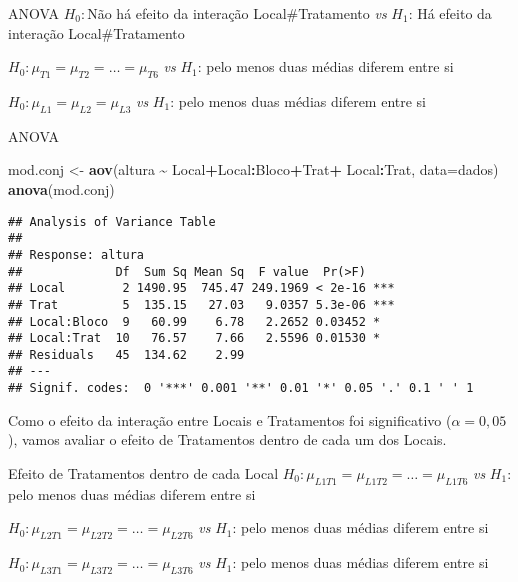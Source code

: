\documentclass[
  ignorenonframetext,
]{beamer}
\newenvironment{Shaded}{\begin{snugshade}}{\end{snugshade}}
\newcommand{\AttributeTok}[1]{\textcolor[rgb]{0.13,0.29,0.53}{#1}}
\newcommand{\FunctionTok}[1]{\textcolor[rgb]{0.13,0.29,0.53}{\textbf{#1}}}
\newcommand{\NormalTok}[1]{#1}
\newcommand{\OtherTok}[1]{\textcolor[rgb]{0.56,0.35,0.01}{#1}}
\newcommand{\SpecialCharTok}[1]{\textcolor[rgb]{0.81,0.36,0.00}{\textbf{#1}}}
\begin{document}
\begin{frame}{ANOVA}
\protect\hypertarget{anova}{}
\(H_0:\)Não há efeito da interação Local\#Tratamento \emph{vs} \(H_1\):
Há efeito da interação Local\#Tratamento

\(H_0: \mu_{T1} = \mu_{T2} = \ldots = \mu_{T6}\) \emph{vs} \(H_1\): pelo
menos duas médias diferem entre si

\(H_0: \mu_{L1} = \mu_{L2} = \mu_{L3}\) \emph{vs} \(H_1\): pelo menos
duas médias diferem entre si
\end{frame}

\begin{frame}[fragile]{ANOVA}
\protect\hypertarget{anova-1}{}
\begin{Shaded}
\begin{Highlighting}[]
\NormalTok{mod.conj }\OtherTok{\textless{}{-}} \FunctionTok{aov}\NormalTok{(altura }\SpecialCharTok{\textasciitilde{}}\NormalTok{ Local}\SpecialCharTok{+}\NormalTok{Local}\SpecialCharTok{:}\NormalTok{Bloco}\SpecialCharTok{+}\NormalTok{Trat}\SpecialCharTok{+}\NormalTok{ Local}\SpecialCharTok{:}\NormalTok{Trat, }
                \AttributeTok{data=}\NormalTok{dados)}
\FunctionTok{anova}\NormalTok{(mod.conj)}
\end{Highlighting}
\end{Shaded}

\begin{verbatim}
## Analysis of Variance Table
## 
## Response: altura
##             Df  Sum Sq Mean Sq  F value  Pr(>F)    
## Local        2 1490.95  745.47 249.1969 < 2e-16 ***
## Trat         5  135.15   27.03   9.0357 5.3e-06 ***
## Local:Bloco  9   60.99    6.78   2.2652 0.03452 *  
## Local:Trat  10   76.57    7.66   2.5596 0.01530 *  
## Residuals   45  134.62    2.99                     
## ---
## Signif. codes:  0 '***' 0.001 '**' 0.01 '*' 0.05 '.' 0.1 ' ' 1
\end{verbatim}

Como o efeito da interação entre Locais e Tratamentos foi significativo
(\(\alpha = 0,05\)), vamos avaliar o efeito de Tratamentos dentro de
cada um dos Locais.
\end{frame}

\begin{frame}{Efeito de Tratamentos dentro de cada Local}
\protect\hypertarget{efeito-de-tratamentos-dentro-de-cada-local}{}
\(H_0: \mu_{L1T1} = \mu_{L1T2} = \ldots = \mu_{L1T6}\) \emph{vs}
\(H_1\): pelo menos duas médias diferem entre si

\(H_0: \mu_{L2T1} = \mu_{L2T2} = \ldots = \mu_{L2T6}\) \emph{vs}
\(H_1\): pelo menos duas médias diferem entre si

\(H_0: \mu_{L3T1} = \mu_{L3T2} = \ldots = \mu_{L3T6}\) \emph{vs}
\(H_1\): pelo menos duas médias diferem entre si
\end{frame}
\end{document}
